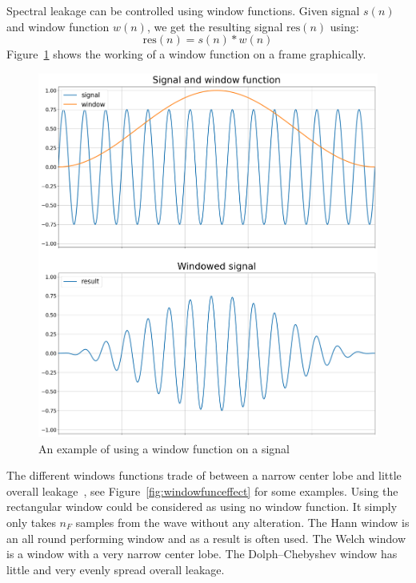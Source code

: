 \documentclass[10pt,twocolumn]{article}
\begin{document}
Spectral leakage can be controlled using window functions. Given signal $s(n)$ and window function $w(n)$, we get the resulting signal $\text{res}(n)$ using:
\[ \text{res}(n) = s(n) * w(n) \]
Figure~\ref{fig:windowfunc} shows the working of a window function on a frame graphically.
\begin{figure}[H]
    \centering
    \includegraphics[width=\linewidth]{fig/window.png}
    \caption{An example of using a window function on a signal}
    \label{fig:windowfunc}
\end{figure}
\noindent The different windows functions trade of between a narrow center lobe and little overall leakage~\cite{windowfunc}, see Figure~\ref{fig:windowfunceffect} for some examples. Using the rectangular window could be considered as using no window function. It simply only takes $n_F$ samples from the wave without any alteration. The Hann window is an all round performing window and as a result is often used. The Welch window is a window with a very narrow center lobe. The Dolph–Chebyshev window has little and very evenly spread overall leakage.
\end{document}
